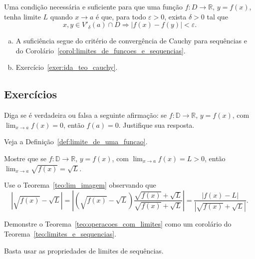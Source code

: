 \begin{teo}
  Uma condição necessária e suficiente para que uma função $f:D\to\mathbb{R}$, $y=f(x)$, tenha limite $L$ quando $x\to a$ é que, para todo $\varepsilon>0$, exista $\delta>0$ tal que
  \begin{equation}
    x,y\in V'_\delta(a)\cap D \Rightarrow |f(x)-f(y)|<\varepsilon.
  \end{equation}
\end{teo}
\begin{dem}
  \begin{enumerate}[a)]
  \item A suficiência segue do critério de convergência de Cauchy para sequências e do Corolário~\ref{corol:limites_de_funcoes_e_sequencias}.
  \item Exercício~\ref{exer:ida_teo_cauchy}.
  \end{enumerate}
\end{dem}

\subsection*{Exercícios}

\begin{exer}
  Diga se é verdadeira ou falsa a seguinte afirmação: se $f:\mathbb{D}\to\mathbb{R}$, $y=f(x)$, com $\lim_{x\to a}f(x)=0$, então $f(a)=0$. Justifique sua resposta.
\end{exer}
\begin{resp}
  Veja a Definição~\ref{def:limite_de_uma_funcao}.
\end{resp}

\begin{exer}
  Mostre que se $f:\mathbb{D}\to\mathbb{R}$, $y=f(x)$, com $\lim_{x\to a}f(x)=L>0$, então $\lim_{x\to a}\sqrt{f(x)}=\sqrt{L}$.
\end{exer}
\begin{resp}
  Use o Teorema~\ref{teo:lim_imagem} observando que
  \begin{equation}
    |\sqrt{f(x)}-\sqrt{L}| = |(\sqrt{f(x)}-\sqrt{L})\frac{\sqrt{f(x)}+\sqrt{L}}{\sqrt{f(x)}+\sqrt{L}}| = \frac{|f(x) - L|}{|\sqrt{f(x)}+\sqrt{L}|}.
  \end{equation}
\end{resp}

\begin{exer}
  Demonstre o Teorema~\ref{teo:operacoes_com_limites} como um corolário do Teorema~\ref{teo:limites_e_sequencias}.
\end{exer}
\begin{resp}
  Basta usar as propriedades de limites de sequências.
\end{resp}

